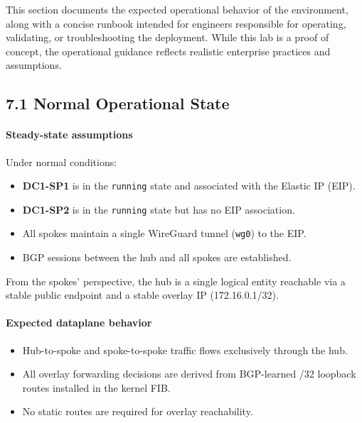 \documentclass[11pt]{article}
\begin{document}
This section documents the expected operational behavior of the environment, along with a concise runbook intended for engineers responsible for operating, validating, or troubleshooting the deployment. While this lab is a proof of concept, the operational guidance reflects realistic enterprise practices and assumptions.

%
%
\subsection{7.1 Normal Operational State}
\label{sec:normal-operational-state}

\paragraph{Steady-state assumptions}
Under normal conditions:
\begin{itemize}
  \item \textbf{DC1-SP1} is in the \texttt{running} state and associated with the Elastic IP (EIP).
  \item \textbf{DC1-SP2} is in the \texttt{running} state but has no EIP association.
  \item All spokes maintain a single WireGuard tunnel (\texttt{wg0}) to the EIP.
  \item BGP sessions between the hub and all spokes are established.
\end{itemize}

From the spokes’ perspective, the hub is a single logical entity reachable via a stable public endpoint and a stable overlay IP (172.16.0.1/32).

\paragraph{Expected dataplane behavior}
\begin{itemize}
  \item Hub-to-spoke and spoke-to-spoke traffic flows exclusively through the hub.
  \item All overlay forwarding decisions are derived from BGP-learned /32 loopback routes installed in the kernel FIB.
  \item No static routes are required for overlay reachability.
\end{itemize}
\end{document}
